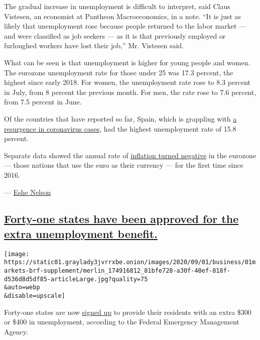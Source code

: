 The gradual increase in unemployment is difficult to interpret, said
Claus Vistesen, an economist at Pantheon Macroeconomics, in a note. ``It
is just as likely that unemployment rose because people returned to the
labor market --- and were classified as job seekers --- as it is that
previously employed or furloughed workers have lost their job,'' Mr.
Vistesen said.

What can be seen is that unemployment is higher for young people and
women. The eurozone unemployment rate for those under 25 was 17.3
percent, the highest since early 2018. For women, the unemployment rate
rose to 8.3 percent in July, from 8 percent the previous month. For men,
the rate rose to 7.6 percent, from 7.5 percent in June.

Of the countries that have reported so far, Spain, which is grappling
with
\href{https://www.nytimes3xbfgragh.onion/2020/08/31/world/europe/coronavirus-covid-spain-second-wave.html}{a
resurgence in coronavirus cases}, had the highest unemployment rate of
15.8 percent.

Separate data showed the annual rate of
\href{https://ec.europa.eu/eurostat/documents/2995521/10545459/2-01092020-AP-EN.pdf/7c0db6bb-3974-ce20-a7f0-6281743d0d7c}{inflation
turned negative} in the eurozone --- those nations that use the euro as
their currency --- for the first time since 2016.

--- \href{https://www.nytimes3xbfgragh.onion/by/eshe-nelson}{Eshe
Nelson}

\hypertarget{forty-one-states-have-been-approved-for-the-extra-unemployment-benefit}{%
\subsection{\texorpdfstring{\protect\hyperlink{forty-one-states-have-been-approved-for-the-extra-unemployment-benefit}{Forty-one
states have been approved for the extra unemployment
benefit.}}{Forty-one states have been approved for the extra unemployment benefit.}}\label{forty-one-states-have-been-approved-for-the-extra-unemployment-benefit}}

\texttt{[image: https://static01.graylady3jvrrxbe.onion/images/2020/09/01/business/01markets-brf-supplement/merlin\_174916812\_81bfe728-a30f-40ef-818f-d536d8d5df85-articleLarge.jpg?quality=75\\\&auto=webp\\\&disable=upscale]}

Forty-one states are now
\href{https://www.nytimes3xbfgragh.onion/article/stimulus-unemployment-payment-benefit.html}{signed
up} to provide their residents with an extra \$300 or \$400 in
unemployment, according to the Federal Emergency Management Agency.

